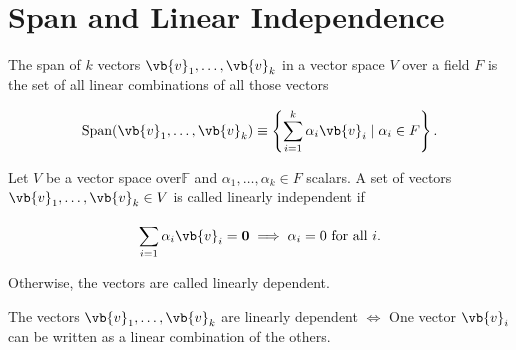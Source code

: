 \documentclass[a4paper,12pt]{report}
\begin{document}
\section{Span and Linear Independence}

\begin{definition}
    The span of \(k\) vectors \(\vb{v} _{1} , \ldots , \vb{v} _{k} \) in a vector space \(V\) over a field \(F\) is the set of all linear combinations of all those vectors
\end{definition}

\begin{equation}
    \text{Span} (\vb{v} _{1}, \ldots ,\vb{v} _{k}  ) \equiv  \left\{\sum_{i=1}^{k} \alpha _{i}\vb{v} _{i} \mid  \alpha _{i}\in F    \right\}.
\end{equation}

\begin{definition}
Let \(V\) be a vector space over\(\mathbb{F}\) and \(\alpha _{1}, \ldots , \alpha _{k} \in  F  \) scalars. A set of vectors \(\vb{v} _{1}, \ldots , \vb{v} _{k} \in V\) is called linearly independent if 

\begin{equation}
    \sum_{i=1}^{} \alpha _{i} \vb{v} _{i} = \boldsymbol{0} \implies \alpha _{i} = 0 \text{ for all } i.      
\end{equation}

Otherwise, the vectors are called linearly dependent. 
\end{definition}

\begin{corollary}
The vectors \(\vb{v} _{1}, \ldots , \vb{v} _{k}  \) are linearly dependent \(\iff \) One vector \(\vb{v} _{i} \) can be written as a linear combination of the others. 
\end{corollary}
\end{document}
